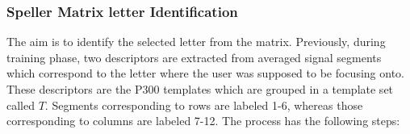 \documentclass[entropy,article,submit,moreauthors,pdftex,10pt,a4paper]{mdpi}
\begin{document}
\subsubsection{Speller Matrix letter Identification}
\label{Classification}


The aim is to identify the selected letter from the matrix. Previously, during training phase, two descriptors are extracted from averaged signal segments which correspond to the letter where the user was supposed to be focusing onto.  These descriptors are the P300 templates which are grouped in a template set called $ T $.  Segments corresponding to rows are labeled 1-6, whereas those corresponding to columns are labeled 7-12.  The process has the following steps:
\end{document}
